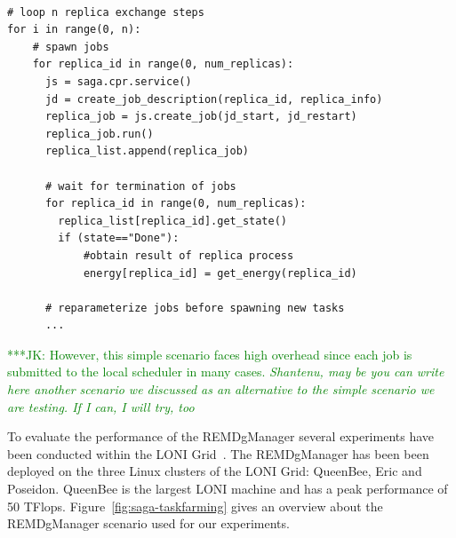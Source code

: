 \documentclass[times, 10pt,twocolumn]{article}
\newcommand{\kimnote}[1]{ {\textcolor{green} { ***JK: #1 }}}
\newcommand{\jhanote}[1]{ {\textcolor{red} { ***SJ: #1 }}}
\newcommand{\kimnote}[1]{}
\newcommand{\jhanote}[1]{}
\begin{document}
\begin{lstlisting}[style=myPythonListing, float=t, caption={REMDgManager: Replica Orchestration}, 
label={lst:python_saga_chkpt_reg}]

# loop n replica exchange steps  
for i in range(0, n):     
    # spawn jobs
    for replica_id in range(0, num_replicas):
      js = saga.cpr.service()
      jd = create_job_description(replica_id, replica_info)    
      replica_job = js.create_job(jd_start, jd_restart)
      replica_job.run()
      replica_list.append(replica_job)
     
      # wait for termination of jobs
      for replica_id in range(0, num_replicas):     
        replica_list[replica_id].get_state()
        if (state=="Done"):                          
            #obtain result of replica process
            energy[replica_id] = get_energy(replica_id)
 
      # reparameterize jobs before spawning new tasks      
      ...                    
\end{lstlisting}


 \kimnote{However, this simple scenario faces high overhead since each
   job is submitted to the local scheduler in many cases. \it
   Shantenu, may be you can write here another scenario we discussed
   as an alternative to the simple scenario we are testing.  If I can,
   I will try, too }


\label{sec:exp}       
        
To evaluate the performance of the REMDgManager several experiments
have been conducted within the LONI Grid~\cite{Allen:2003xy}. The
REMDgManager has been been deployed on the three Linux clusters of the
LONI Grid: QueenBee, Eric and Poseidon.  QueenBee is the largest LONI
machine and has a peak performance of 50 TFlops.
Figure~\ref{fig:saga-taskfarming} gives an overview about the
REMDgManager scenario used for our experiments.
\end{document}
